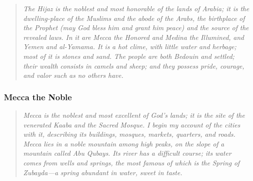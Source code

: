 \documentclass[11pt,a4paper]{article}
\begin{document}
\bigskip

\begin{quote}
\small
\textit{The Hijaz is the noblest and most honorable of the lands of Arabia; it is the dwelling-place of the Muslims and the abode of the Arabs, the birthplace of the Prophet (may God bless him and grant him peace) and the source of the revealed laws. In it are Mecca the Honored and Medina the Illumined, and Yemen and al-Yamama. It is a hot clime, with little water and herbage; most of it is stones and sand. The people are both Bedouin and settled; their wealth consists in camels and sheep; and they possess pride, courage, and valor such as no others have.}
\end{quote}

\vspace{0.5cm}

\subsubsection{Mecca the Noble}

{\small\arabicfont
{}}

\bigskip

\begin{quote}
\small
\textit{Mecca is the noblest and most excellent of God's lands; it is the site of the venerated Kaaba and the Sacred Mosque. I begin my account of the cities with it, describing its buildings, mosques, markets, quarters, and roads. Mecca lies in a noble mountain among high peaks, on the slope of a mountain called Abu Qubays. Its river has a difficult course; its water comes from wells and springs, the most famous of which is the Spring of Zubayda---a spring abundant in water, sweet in taste.}
\end{quote}

\vspace{0.3cm}
\end{document}
